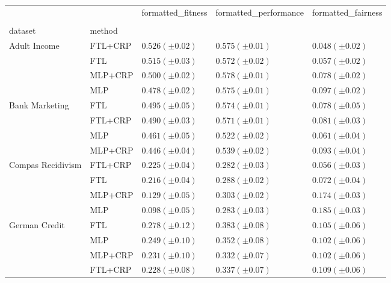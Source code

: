 \begin{tabular}{lllll}
\toprule
 &  & formatted_fitness & formatted_performance & formatted_fairness \\
 &  &  &  &  \\
dataset & method &  &  &  \\
\midrule
\multirow[t]{4}{*}{Adult Income} & FTL+CRP & $0.526 (\pm0.02)$ & $0.575 (\pm0.01)$ & $0.048 (\pm0.02)$ \\
 & FTL & $0.515 (\pm0.03)$ & $0.572 (\pm0.02)$ & $0.057 (\pm0.02)$ \\
 & MLP+CRP & $0.500 (\pm0.02)$ & $0.578 (\pm0.01)$ & $0.078 (\pm0.02)$ \\
 & MLP & $0.478 (\pm0.02)$ & $0.575 (\pm0.01)$ & $0.097 (\pm0.02)$ \\
\cline{1-5}
\multirow[t]{4}{*}{Bank Marketing} & FTL & $0.495 (\pm0.05)$ & $0.574 (\pm0.01)$ & $0.078 (\pm0.05)$ \\
 & FTL+CRP & $0.490 (\pm0.03)$ & $0.571 (\pm0.01)$ & $0.081 (\pm0.03)$ \\
 & MLP & $0.461 (\pm0.05)$ & $0.522 (\pm0.02)$ & $0.061 (\pm0.04)$ \\
 & MLP+CRP & $0.446 (\pm0.04)$ & $0.539 (\pm0.02)$ & $0.093 (\pm0.04)$ \\
\cline{1-5}
\multirow[t]{4}{*}{Compas Recidivism} & FTL+CRP & $0.225 (\pm0.04)$ & $0.282 (\pm0.03)$ & $0.056 (\pm0.03)$ \\
 & FTL & $0.216 (\pm0.04)$ & $0.288 (\pm0.02)$ & $0.072 (\pm0.04)$ \\
 & MLP+CRP & $0.129 (\pm0.05)$ & $0.303 (\pm0.02)$ & $0.174 (\pm0.03)$ \\
 & MLP & $0.098 (\pm0.05)$ & $0.283 (\pm0.03)$ & $0.185 (\pm0.03)$ \\
\cline{1-5}
\multirow[t]{4}{*}{German Credit} & FTL & $0.278 (\pm0.12)$ & $0.383 (\pm0.08)$ & $0.105 (\pm0.06)$ \\
 & MLP & $0.249 (\pm0.10)$ & $0.352 (\pm0.08)$ & $0.102 (\pm0.06)$ \\
 & MLP+CRP & $0.231 (\pm0.10)$ & $0.332 (\pm0.07)$ & $0.102 (\pm0.06)$ \\
 & FTL+CRP & $0.228 (\pm0.08)$ & $0.337 (\pm0.07)$ & $0.109 (\pm0.06)$ \\
\cline{1-5}
\bottomrule
\end{tabular}

